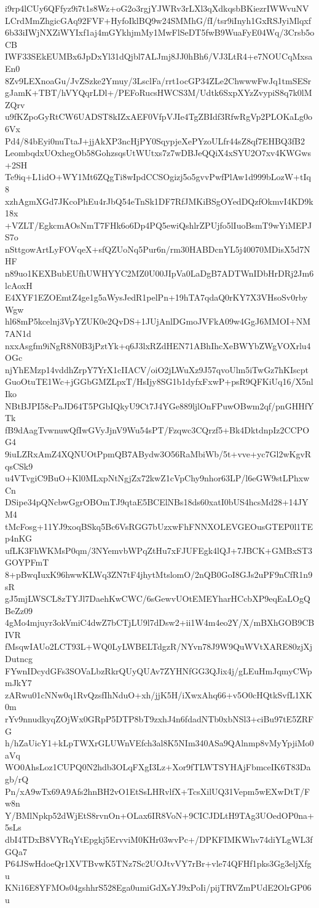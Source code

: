 i9rp4lCUy6QFfyz9i7t1s8Wz+oG2o3rgjYJWRv3rLXl3qXdkqsbBKiezrIWWvuNV
LCrdMmZhgicGAq92FVF+HyfoIklBQ9w24SMMhG/fI/tsr9iInyh1GxRSJyiMlqxf
6b33iIWjNXZiWYIxf1aj4mGYkhjmMy1MwFlSeDT5fwB9WuaFyE04Wq/3Crsb5oCB
IWF33SEkEUMBx6JpDxYl31dQjbl7ALJmj8JJ0hBh6/VJ3LtR4+e7NOUCqMxsaEn0
8Zv9LEXnoaGu/JvZSzke2Ymuy/3LsclFa/rrt1ocGP34ZLe2ChwwwFwJq1tmSESr
gJamK+TBT/hVYQqrLDl+/PEFoRucsHWCS3M/Udtk6SxpXYzZvypiS8q7k0lMZQrv
u9fKZpoGyRtCW6UADST8kIZxAEF0VfpVJIe4TgZBIdf3RfwRgVp2PLOKaLg0o6Vx
Pd4/84bEyi0nuTtaJ+jjAkXP3ncHjPY0SqypjeXePYzoULfr44sZ8qf7EHBQ3fB2
LeombqdxUOxhegOb58GohzsqsUtWUtxs7z7wDBJeQQiX4xSYU2O7xv4KWGws+2SH
Te9iq+L1idO+WY1Mt6ZQgTi8wIpdCCSOgizj5o5gvvPwfPlAw1d999bLozW+tIq8
xzhAgmXGd7JKcoPhEu4rJbQ54eTnSk1DF7RfJMKiBSgOYedDQzfOkmvI4KD9k18x
+VZLT/EgkcmAOsNmT7FHk6o6Dp4PQ5ewiQshlrZPUjfo5lIuoBsmT9wYiMEPJS7o
nSttgowArtLyFOVqeX+sfQZUoNq5Pur6n/rm30HABDcnYL5j40070MDisX5d7NHF
n89uo1KEXBubEUfhUWHYYC2MZ0U00JIpVa0LaDgB7ADTWnIDbHrDRj2Jm6lcAoxH
E4XYF1EZOEmtZ4ge1g5aWysJedR1pelPn+19hTA7qdaQ0rKY7X3VHsoSv0rbyWgw
hl68mP5kcelnj3VpYZUK0e2QvDS+1JUjAnlDGmoJVFkA09w4GgJ6MMOI+NM7AN1d
nxxAsgfm9iNgR8N0B3jPztYk+q6J3lxRZdHEN71ABhIhcXeBWYbZWgVOXrlu4OGc
njYhEMzp14vddhZrpY7YrX1cIIACV/oiO2jLWuXz9J57qvoUlm5iTwGz7hKIscpt
GuoOtuTE1Wc+jGGbGMZLpxT/HsIjy8SG1b1dyfxFxwP+psR9QFKiUq16/X5nlIko
NBtBJPI58cPaJD64T5PGbIQkyU9Ct7J4YGe889ljlOnFPuwOBwm2qf/pnGHHfYTk
fB9dAagTvwnuwQfIwGVyJjnV9Wu54sPT/Fzqwc3CQrzf5+Bk4DktdnpIz2CCPOG4
9iuLZRxAmZ4XQNUOtPpmQB7ABydw3O56RaMbiWb/5t+vve+yc7Gl2wKgvRqsCSk9
u4VTvgiC9BuO+Kl0MLxpNtNgjZx72kwZ1cVpChy9nhor63LP/l6eGW9stLPhxwCn
DSipe34pQNcbwGgrOBOmTJ9qtaE5BCElNBs18ds60xatI0bUS4hcsMd28+14JYM4
tMcFosg+11YJ9xoqBSkq5Bc6VsRGG7bUzxwFhFNNXOLEVGEOusGTEP0l1TEp4nKG
ufLK3FhWKMsP0qm/3NYemvbWPqZtHu7xFJUFEgk4lQJ+7JBCK+GMBxST3GOYPFmT
8+pBwqIuxK96hwwKLWq3ZN7tF4jhytMtslomO/2nQB0GoI8GJs2uPF9nCfR1n9sR
gJ5mjLWSCL8zTYJl7DaehKwCWC/6sGewvUOtEMEYharHCcbXP9eqEaLOgQBeZz09
4gMo4mjuyr3okVmiC4dwZ7bCTjLU9l7dDsw2+ii1W4m4eo2Y/X/mBXhGOB9CBIVR
fMsqwIAUo2LCT93L+WQ0LyLWBELTdgzR/NYvn78J9W9QuWVtXARE80zjXjDutncg
FYwnIDcydGFs3SOVaLbzRkrQUyQUAv7ZYHNfGG3QJix4j/gLEuHmJqmyCWpmJkY7
zARwu01cNNw0q1RvQzsfIhNduO+xh/jjK5H/iXwxAhq66+v5O0cHQtkSvfL1XK0m
rYv9nnudkyqZOjWx0GRpP5DTP8bT9zxhJ4n6fdadNTb0xbNSl3+ciBu97tE5ZRFG
h/hZaUicY1+kLpTWXrGLUWnVEfch3al8K5NIm340ASa9QAlnmp8vMyYpjiMo0aVq
WO0AhsLoz1CUPQ0N2hdb3OLqFXgI3Lz+Xor9fTLWTSYHAjFbmceIK6T83Dagb/rQ
Pn/xA9wTx69A9Afs2hnBH2vO1EtSsLHRvlfX+TcsXilUQ31Vepm5wEXwDtT/Fw8n
Y/BMlNpkp52dWjEtS8rvnOn+OLax6IR8VoN+9CICJDLtH9TAg3UOedOP0na+5sLs
dbI4TDxB8VYRqYtEpgkj5ErvviM0KHr03wvPc+/DPKFIMKWhv74diYLgWL3fGQa7
P64JSwHdoeQr1XVTBvwK5TNz7Sc2UOJtvVY7rBr+vle74QFHf1pks3Gg3eljXfgu
KNi16E8YFMOs04gshhrS528Ega0umiGdXsYJ9xPoIi/pijTRVZmPUdE2OlrGP06u

